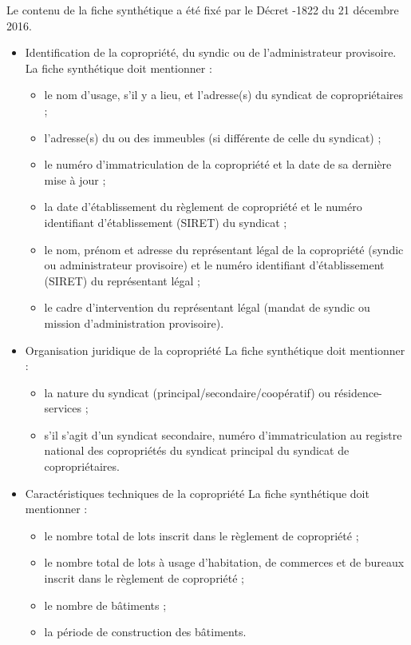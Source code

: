 			Le contenu de la fiche synthétique a été fixé par le Décret -1822 du 21 décembre 2016.
			\begin{itemize}
				\item Identification de la copropriété, du syndic ou de l'administrateur provisoire.
					\newline La fiche synthétique doit mentionner :
					\begin{itemize}
						\item le nom d'usage, s'il y a lieu, et l'adresse(s) du syndicat de copropriétaires ;
						\item l'adresse(s) du ou des immeubles (si différente de celle du syndicat) ;
						\item le numéro d'immatriculation de la copropriété et la date de sa dernière mise à jour ;
						\item la date d'établissement du règlement de copropriété et le numéro identifiant d'établissement
						(SIRET) du syndicat ;
						\item le nom, prénom et adresse du représentant légal de la copropriété (syndic ou administrateur
						provisoire) et le numéro identifiant d'établissement (SIRET) du représentant légal ;
						\item le cadre d'intervention du représentant légal (mandat de syndic ou mission d'administration
						provisoire).
					\end{itemize}
			
				\item Organisation juridique de la copropriété
					\newline La fiche synthétique doit mentionner :
					\begin{itemize}
						\item la nature du syndicat (principal/secondaire/coopératif) ou résidence-services ;
						\item s'il s'agit d'un syndicat secondaire, numéro d'immatriculation au registre national des
						copropriétés du syndicat principal du syndicat de copropriétaires.
					\end{itemize}
				
				\item Caractéristiques techniques de la copropriété
					\newline La fiche synthétique doit mentionner :
					\begin{itemize}
						\item le nombre total de lots inscrit dans le règlement de copropriété ;
						\item le nombre total de lots à usage d'habitation, de commerces et de bureaux inscrit dans le
						règlement de copropriété ;
						\item le nombre de bâtiments ;
						\item la période de construction des bâtiments.
					\end{itemize}
				

\end{itemize}
